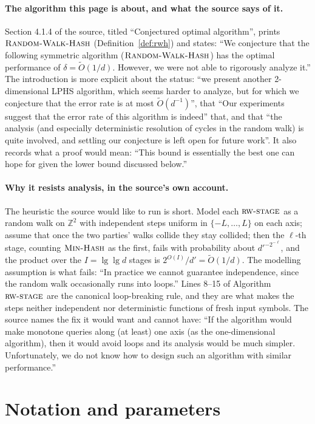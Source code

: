 \documentclass{aicr-conjecture}
\newcommand{\Z}{\mathbb{Z}}
\newcommand{\Ot}{\widetilde{O}}
\newcommand{\MinHash}{\textsc{Min-Hash}}
\newcommand{\rwstage}{\textsc{rw-stage}}
\newcommand{\RWH}{\textsc{Random-Walk-Hash}}
\begin{document}
\paragraph{The algorithm this page is about, and what the source says
  of it.}
Section 4.1.4 of the source, titled ``Conjectured optimal algorithm'',
prints $\RWH$ (Definition~\ref{def:rwh}) and states: ``We conjecture
that the following symmetric algorithm ($\RWH$) has the optimal
performance of $\delta = \Ot(1/d)$. However, we were not able to
rigorously analyze it.'' The introduction is more explicit about the
status: ``we present another 2-dimensional LPHS algorithm, which seems
harder to analyze, but for which we conjecture that the error rate is at
most $\Ot(d^{-1})$'', that ``Our experiments suggest that the error rate
of this algorithm is indeed'' that, and that ``the analysis (and
especially deterministic resolution of cycles in the random walk) is
quite involved, and settling our conjecture is left open for future
work''. It also records what a proof would mean: ``This bound is
essentially the best one can hope for given the lower bound discussed
below.''

\paragraph{Why it resists analysis, in the source's own account.}
The heuristic the source would like to run is short. Model each
$\rwstage$ as a random walk on $\Z^{2}$ with independent steps uniform
in $\{-L, \dots, L\}$ on each axis; assume that once the two parties'
walks collide they stay collided; then the $\ell$-th stage,
counting $\MinHash$ as the first, fails with probability about
$d'^{-2^{-\ell}}$, and the product over the
$I = \lg\lg d$ stages is $2^{O(I)}/d' = \Ot(1/d)$. The modelling
assumption is what fails: ``In practice we cannot guarantee
independence, since the random walk occasionally runs into loops.''
Lines 8--15 of Algorithm~$\rwstage$ are the canonical loop-breaking
rule, and they are what makes the steps neither independent nor
deterministic functions of fresh input symbols. The source names the fix
it would want and cannot have: ``If the algorithm would make monotone
queries along (at least) one axis (as the one-dimensional algorithm),
then it would avoid loops and its analysis would be much simpler.
Unfortunately, we do not know how to design such an algorithm with
similar performance.''

\section{Notation and parameters}\label{sec:notation}
\end{document}
